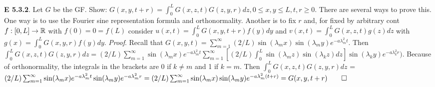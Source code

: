 {\bf E 5.3.2}. Let $G$ be the GF. Show: $G(x,y,t+r)=\int_0^L G(x,z,t)G(z,y,r) dz, 0 \leq x,y\leq L, t,r \geq 0$. There are several ways to prove this.  One way is to use the Fourier sine representation formula and orthonormality.  Another is to fix $r$ and, for fixed by arbitrary cont $f: [0,L] \rightarrow \mathbb{R}$ with $f(0)=0=f(L)$ consider $u(x,t)=\int_0^L G(x,y,t+r)f(y)dy$ and $v(x,t)=\int_0^L G(x,z,t)g(z)dz$ with $g(x)=\int_0^LG(x,y,r)f(y)dy$. {\it Proof}. Recall that $G(x,y,t) = \sum_{m=1}^{\infty} (2/L) \sin(\lambda_mx) \sin(\lambda_m y) e^{-a\lambda_m^2 t}$. Then $\int_0^L G(x,z,t) G(z,y,r) dz = (2/L) \sum_{m=1}^{\infty}\sin(\lambda_mx)  e^{-a \lambda_m^2 t}\sum_{m=1}^{\infty} [(2/L) \int_0^L \sin(\lambda_mz) \sin(\lambda_k z) dz] \sin(\lambda_ky)  e^{-a\lambda_k^2 r})$. Because of orthonormality, the integrals in the brackets are 0 if $k \neq m$ and 1 if $k=m$. Then $\int_0^L G(x,z,t)G(z,y,r) dz$ = $(2/L) \sum_{m=1}^{\infty} \sin(\lambda_mx)  e^{-a\lambda_m^2 t} \sin(\lambda_my)  e^{-a\lambda_m^2 r}= (2/L) \sum_{m=1}^{\infty} \sin(\lambda_m x) \sin(\lambda_m y)  e^{-a\lambda_m^2 (t+r)}=G(x,y,t+r) \qed$